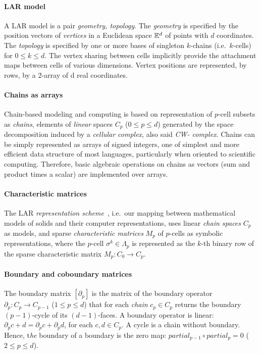 \paragraph{LAR model}
A LAR model is a pair \emph{geometry, topology}. The \emph{geometry} is specified by the  position vectors of \emph{vertices} in a Euclidean space $\mathbb{E}^d$ of points with $d$ coordinates. The \emph{topology} is specified by one or more bases of singleton $k$-chains (i.e.~$k$-cells) for $0 \leq k\leq d$. The vertex sharing between cells implicitly provide the attachment maps between cells of various dimensions.
Vertex positions are represented, by rows, by a 2-array of d real coordinates.

\paragraph{Chains as arrays}
Chain-based modeling and computing is based on representation of $p$-cell subsets as \emph{chains}, elements of \emph{linear} spaces $C_p$ ($0\leq p\leq d$) generated by the space decomposition induced by a \emph{cellular complex}, also said \emph{CW- complex}.
Chains can be simply represented as arrays of signed integers, one of simplest and more efficient data structure of most languages, particularly when oriented to scientific computing.
Therefore, basic algebraic operations on chains as vectors (sum and product times a scalar) are implemented over arrays.

\paragraph{Characteristic matrices}
The LAR \emph{representation scheme}~\cite{Requicha:1980:RRS:356827.356833}, i.e.~our mapping between mathematical models of solids and their computer representations, uses linear \emph{chain spaces} $C_p$ as models, and sparse \emph{characteristic matrices} $M_p$  of $p$-cells as symbolic representations, where the $p$-cell $\sigma^k\in\Lambda_p$ is represented as the $k$-th binary row of the  sparse characteristic matrix $M_p: C_0\to C_p$.

\paragraph{Boundary and coboundary matrices}

The boundary matrix $[\partial_p]$ is the matrix of the boundary operator $\partial_p: C_p\to C_{p-1}$ ($1\leq p\leq d$) that for each \emph{chain} $c_p\in C_p$ returns the  boundary $(p-1)$-cycle of its $(d-1)$-faces.  A boundary operator is linear: $\partial_p c + d = \partial_p c + \partial_p d$, for each $c,d\in C_p$. A cycle is a chain without boundary. Hence, t\emph{he} boundary of a boundary is the zero map: $partial_{p-1} \circ partial_p = 0$ ($2\leq p\leq d$).

